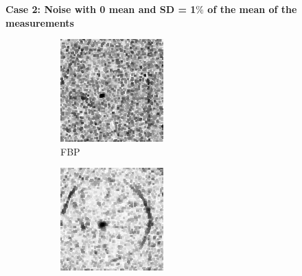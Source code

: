\documentclass{article}
\begin{document}
\textbf{Case 2: Noise with 0 mean and SD = 1$\%$ of the mean of the measurements}
\begin{figure}[!h]
    \begin{subfigure}[b]{0.2\linewidth}
        \includegraphics[width=\textwidth]{../images/potato/artefacts/with_noise/weightsIm_fbp30.png}
\captionsetup{labelformat=empty}       
 \caption{FBP}
    \end{subfigure}
    \begin{subfigure}[b]{0.2\linewidth}
        \includegraphics[width=\textwidth]{../images/potato/artefacts/with_noise/weightsIm_sirt30.png}

\end{subfigure}
\end{figure}
\end{document}
